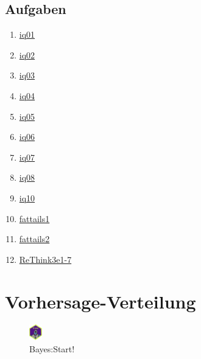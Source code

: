 \documentclass[
  a4paper,
  DIV=11]{scrreprt}
\providecommand{\tightlist}{%
  \setlength{\itemsep}{0pt}\setlength{\parskip}{0pt}}\usepackage{longtable,booktabs,array}
\theoremstyle{definition}
\theoremstyle{remark}
\begin{document}
\hypertarget{aufgaben-4}{%
\section{Aufgaben}\label{aufgaben-4}}

\begin{enumerate}
\def\labelenumi{\arabic{enumi}.}
\tightlist
\item
  \href{https://datenwerk.netlify.app/posts/iq01/iq01.html}{iq01}
\item
  \href{https://datenwerk.netlify.app/posts/iq02/iq02.html}{iq02}
\item
  \href{https://datenwerk.netlify.app/posts/iq03/iq03.html}{iq03}
\item
  \href{https://datenwerk.netlify.app/posts/iq04/iq04.html}{iq04}
\item
  \href{https://datenwerk.netlify.app/posts/iq05/iq05.html}{iq05}
\item
  \href{https://datenwerk.netlify.app/posts/iq06/iq06.html}{iq06}
\item
  \href{https://datenwerk.netlify.app/posts/iq07/iq07.html}{iq07}
\item
  \href{https://datenwerk.netlify.app/posts/iq08/iq08.html}{iq08}
\item
  \href{https://datenwerk.netlify.app/posts/iq10/iq10.html}{iq10}
\item
  \href{https://datenwerk.netlify.app/posts/fattails01/fattails01.html}{fattails1}
\item
  \href{https://datenwerk.netlify.app/posts/fattails02/fattails02.html}{fattails2}
\item
  \href{https://datenwerk.netlify.app/posts/rethink3e1-7/rethink3e1-7}{ReThink3e1-7}
\end{enumerate}


\hypertarget{vorhersage-verteilung}{%
\chapter{Vorhersage-Verteilung}\label{vorhersage-verteilung}}

\begin{figure}

{\centering \includegraphics[width=0.05\textwidth,height=\textheight]{./img/Golem_hex.png}

}

\caption{Bayes:Start!}

\end{figure}
\end{document}
